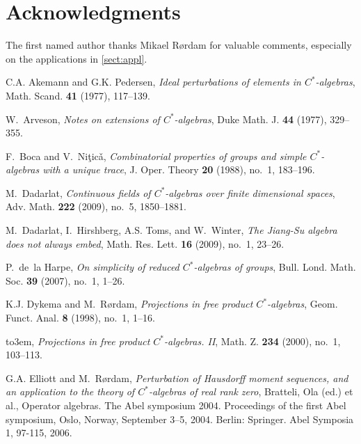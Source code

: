 \documentclass{amsart}
\theoremstyle{definition}
\begin{document}
\section*{Acknowledgments}

\noindent
The first named author thanks Mikael R{\o}rdam for valuable comments, especially on the applications in \autoref{sect:appl}.\\

\providecommand{\bysame}{\leavevmode\hbox to3em{\hrulefill}\thinspace}
\providecommand{\MR}{\relax\ifhmode\unskip\space\fi MR }
\providecommand{\MRhref}[2]{  \href{http://www.ams.org/mathscinet-getitem?mr=#1}{#2}
}
\providecommand{\href}[2]{#2}
\begin{thebibliography}{DHTW09}

C.A. Akemann and G.K. Pedersen, \emph{{Ideal perturbations of elements in
  {{$C^*$-al\-ge\-bra}}{s}}}, Math. Scand. \textbf{41} (1977), 117--139.

W.~Arveson, \emph{{Notes on extensions of {{$C^*$-al\-ge\-bra}}{s}}}, Duke Math. J. \textbf{44}
  (1977), 329--355.

F.~Boca and V.~Ni\c{t}ic\v{a}, \emph{{Combinatorial properties of groups and
  simple {{$C^*$-al\-ge\-bra}}{s} with a unique trace}}, J. Oper. Theory \textbf{20} (1988),
  no.~1, 183--196.

M.~Dadarlat, \emph{{Continuous fields of {{$C^*$-al\-ge\-bra}}{s} over finite dimensional
  spaces}}, Adv. Math. \textbf{222} (2009), no.~5, 1850--1881.

M.~Dadarlat, I.~Hirshberg, A.S. Toms, and W.~Winter, \emph{{The Jiang-Su
  algebra does not always embed}}, Math. Res. Lett. \textbf{16} (2009), no.~1,
  23--26.

P.~de~la Harpe, \emph{{On simplicity of reduced {{$C^*$-al\-ge\-bra}}{s} of groups}}, Bull. Lond.
  Math. Soc. \textbf{39} (2007), no.~1, 1--26.

K.J. Dykema and M.~R{\o}rdam, \emph{{Projections in free product {{$C^*$-al\-ge\-bra}}{s}}},
  Geom. Funct. Anal. \textbf{8} (1998), no.~1, 1--16.

\bysame, \emph{{Projections in free product {{$C^*$-al\-ge\-bra}}{s}. II}}, Math. Z. \textbf{234}
  (2000), no.~1, 103--113.

G.A. Elliott and M.~R\o{r}dam, \emph{{Perturbation of Hausdorff moment
  sequences, and an application to the theory of {{$C^*$-al\-ge\-bra}}{s} of real rank zero}},
  {Bratteli, Ola (ed.) et al., Operator algebras. The Abel symposium 2004.
  Proceedings of the first Abel symposium, Oslo, Norway, September 3--5, 2004.
  Berlin: Springer. Abel Symposia 1, 97-115}, 2006.


\end{thebibliography}
\end{document}
